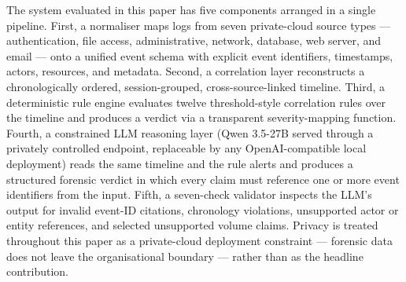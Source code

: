\documentclass[conference]{IEEEtran}
\begin{document}
The system evaluated in this paper has five components arranged in a single pipeline. First, a normaliser maps logs from seven private-cloud source types --- authentication, file access, administrative, network, database, web server, and email --- onto a unified event schema with explicit event identifiers, timestamps, actors, resources, and metadata. Second, a correlation layer reconstructs a chronologically ordered, session-grouped, cross-source-linked timeline. Third, a deterministic rule engine evaluates twelve threshold-style correlation rules over the timeline and produces a verdict via a transparent severity-mapping function. Fourth, a constrained LLM reasoning layer (Qwen 3.5-27B served through a privately controlled endpoint, replaceable by any OpenAI-compatible local deployment) reads the same timeline and the rule alerts and produces a structured forensic verdict in which every claim must reference one or more event identifiers from the input. Fifth, a seven-check validator inspects the LLM's output for invalid event-ID citations, chronology violations, unsupported actor or entity references, and selected unsupported volume claims. Privacy is treated throughout this paper as a private-cloud deployment constraint --- forensic data does not leave the organisational boundary --- rather than as the headline contribution.
\end{document}
